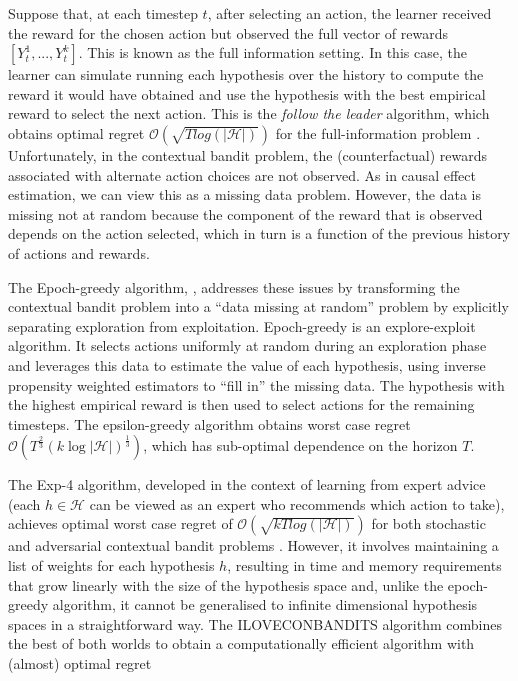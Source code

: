 \documentclass[11pt,a4paper,twoside]{report}
\newcommand{\card}[1]{\left\vert{#1}\right\vert}
\newcommand{\bigo}[1]{\mathcal{O}\left( #1 \right)}
\newcommand{\cfb}[2]{{#1}_t^{#2}} %
\newcommand{\quotes}[1]{``#1''}
\theoremstyle{plain}
\theoremstyle{definition}
\begin{document}
Suppose that, at each timestep $t$, after selecting an action, the learner received the reward for the chosen action but observed the full vector of rewards $[\cfb{Y}{1},...,\cfb{Y}{k}]$. This is known as the full information setting. In this case, the learner can simulate running each hypothesis over the history to compute the reward it would have obtained and use the hypothesis with the best empirical reward to select the next action. This is the \emph{follow the leader} algorithm, which obtains optimal regret $\bigo{\sqrt{T log(\card{\mathcal{H}})}}$ for the full-information problem \citep{cesa2006prediction}. Unfortunately, in the contextual bandit problem, the (counterfactual) rewards associated with alternate action choices are not observed. As in causal effect estimation, we can view this as a missing data problem. However, the data is missing not at random because the component of the reward that is observed depends on the action selected, which in turn is a function of the previous history of actions and rewards. 

The Epoch-greedy algorithm, \citep{Langford2008}, addresses these issues by transforming the contextual bandit problem into a \quotes{data missing at random} problem by explicitly separating exploration from exploitation. Epoch-greedy is an explore-exploit algorithm. It selects actions uniformly at random during an exploration phase and leverages this data to estimate the value of each hypothesis, using inverse propensity weighted estimators to \quotes{fill in} the missing data. The hypothesis with the highest empirical reward is then used to select actions for the remaining timesteps. The epsilon-greedy algorithm obtains worst case regret $\bigo{T^{\frac{2}{3}}(k \log{\card{\mathcal{H}}})^{\frac{1}{3}}}$, which has sub-optimal dependence on the horizon $T$.

The Exp-4 algorithm, developed in the context of learning from expert advice (each $h \in \mathcal{H}$ can be viewed as an expert who recommends which action to take), achieves optimal worst case regret of $\bigo{\sqrt{kT log(\card{\mathcal{H}})}}$ for both stochastic and adversarial contextual bandit problems \citep{Auer2002a}. However, it involves maintaining a list of weights for each hypothesis $h$, resulting in time and memory requirements that grow linearly with the size of the hypothesis space and, unlike the epoch-greedy algorithm, it cannot be generalised to infinite dimensional hypothesis spaces in a straightforward way. The ILOVECONBANDITS algorithm combines the best of both worlds to obtain a computationally efficient algorithm with (almost) optimal regret \citep{Agarwal2014}
\end{document}
